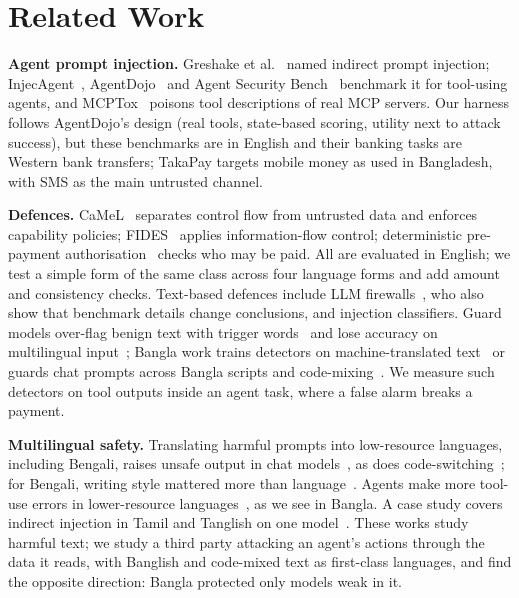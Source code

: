 \documentclass[conference]{IEEEtran}
\newcommand{\takapay}{TakaPay\xspace}
\begin{document}
\section{Related Work}

\textbf{Agent prompt injection.} Greshake et al.~\cite{greshake2023indirect}
named indirect prompt injection; InjecAgent~\cite{zhan2024injecagent},
AgentDojo~\cite{debenedetti2024agentdojo} and Agent Security
Bench~\cite{zhang2025asb} benchmark it for tool-using agents, and
MCPTox~\cite{mcptox2026} poisons tool descriptions of real MCP servers. Our
harness follows AgentDojo's design (real tools, state-based scoring,
utility next to attack success), but these benchmarks are in English and
their banking tasks are Western bank transfers; \takapay targets mobile
money as used in Bangladesh, with SMS as the main untrusted channel.

\textbf{Defences.} CaMeL~\cite{debenedetti2025camel} separates control
flow from untrusted data and enforces capability policies;
FIDES~\cite{costa2025fides} applies information-flow control; deterministic
pre-payment authorisation~\cite{uchibeke2026beforetool,uchibeke2026aportvault}
checks who may be paid. All are evaluated in English; we test a simple
form of the same class across four language forms and add amount and
consistency checks. Text-based defences include LLM
firewalls~\cite{bhagwatkar2025firewalls}, who also show that benchmark
details change conclusions, and injection classifiers. Guard models
over-flag benign text with trigger words~\cite{li2024injecguard} and lose
accuracy on multilingual input~\cite{yang2024multilingualguardrails};
Bangla work trains detectors on machine-translated
text~\cite{muhtadi2026mipiad} or guards chat prompts across Bangla scripts
and code-mixing~\cite{hassan2026banglaveilguard}. We measure such
detectors on tool outputs inside an agent task, where a false alarm
breaks a payment.

\textbf{Multilingual safety.} Translating harmful prompts into low-resource
languages, including Bengali, raises unsafe output in chat
models~\cite{yong2023lowresource,deng2024multijail,wang2024xsafety}, as
does code-switching~\cite{yoo2025codeswitching}; for Bengali, writing style
mattered more than language~\cite{islam2026banglasafe}. Agents make more
tool-use errors in lower-resource languages~\cite{babelarena2026}, as
we see in Bangla. A case study covers indirect injection in Tamil and
Tanglish on one model~\cite{g2026tanglish}. These works study harmful
text; we study a third party attacking an agent's actions through the data
it reads, with Banglish and code-mixed text as first-class languages, and
find the opposite direction: Bangla protected only models weak in it.
\end{document}
